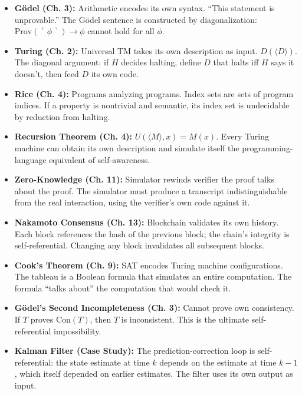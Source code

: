 \begin{itemize}
\item \textbf{G\"odel (Ch. 3):} Arithmetic encodes its own syntax. ``This statement is unprovable.'' The G\"odel sentence is constructed by diagonalization: $\text{Prov}(\ulcorner\phi\urcorner) \to \phi$ cannot hold for all $\phi$.

\item \textbf{Turing (Ch. 2):} Universal TM takes its own description as input. $D(\langle D \rangle)$. The diagonal argument: if $H$ decides halting, define $D$ that halts iff $H$ says it doesn't, then feed $D$ its own code.

\item \textbf{Rice (Ch. 4):} Programs analyzing programs. Index sets are sets of program indices. If a property is nontrivial and semantic, its index set is undecidable by reduction from halting.

\item \textbf{Recursion Theorem (Ch. 4):} $U(\langle M \rangle, x) = M(x)$. Every Turing machine can obtain its own description and simulate itself the programming-language equivalent of self-awareness.

\item \textbf{Zero-Knowledge (Ch. 11):} Simulator rewinds verifier the proof talks about the proof. The simulator must produce a transcript indistinguishable from the real interaction, using the verifier's own code against it.

\item \textbf{Nakamoto Consensus (Ch. 13):} Blockchain validates its own history. Each block references the hash of the previous block; the chain's integrity is self-referential. Changing any block invalidates all subsequent blocks.

\item \textbf{Cook's Theorem (Ch. 9):} SAT encodes Turing machine configurations. The tableau is a Boolean formula that simulates an entire computation. The formula ``talks about'' the computation that would check it.

\item \textbf{G\"odel's Second Incompleteness (Ch. 3):} Cannot prove own consistency. If $T$ proves $\text{Con}(T)$, then $T$ is inconsistent. This is the ultimate self-referential impossibility.

\item \textbf{Kalman Filter (Case Study):} The prediction-correction loop is self-referential: the state estimate at time $k$ depends on the estimate at time $k-1$, which itself depended on earlier estimates. The filter uses its own output as input.


\end{itemize}
